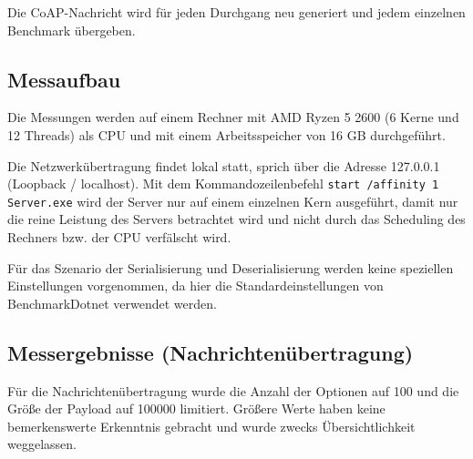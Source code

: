 Die CoAP-Nachricht wird für jeden Durchgang neu generiert und jedem einzelnen Benchmark übergeben.

\subsection{Messaufbau}
\label{subsec:messaufbau}

Die Messungen werden auf einem Rechner mit AMD Ryzen 5 2600 (6 Kerne und 12 Threads) als CPU und mit einem Arbeitsspeicher von 16 GB durchgeführt.

Die Netzwerkübertragung findet lokal statt, sprich über die Adresse 127.0.0.1 (Loopback / localhost). Mit dem Kommandozeilenbefehl \texttt{start /affinity 1 Server.exe} wird der Server nur auf einem einzelnen Kern ausgeführt, damit nur die reine Leistung des Servers betrachtet wird und nicht durch das Scheduling des Rechners bzw. der CPU verfälscht wird.

Für das Szenario der Serialisierung und Deserialisierung werden keine speziellen Einstellungen vorgenommen, da hier die Standardeinstellungen von BenchmarkDotnet verwendet werden.

\subsection{Messergebnisse (Nachrichtenübertragung)}
\label{subsec:messergebnisse-nachrichtenuebertragung}

Für die Nachrichtenübertragung wurde die Anzahl der Optionen auf 100 und die Größe der Payload auf 100000 limitiert. Größere Werte haben keine bemerkenswerte Erkenntnis gebracht und wurde zwecks Übersichtlichkeit weggelassen.

\begin{table}[h]
    \caption{Asynchrone Übertragung mit 100 Options und mit einer Payload von 100 Bytes.}
    \label{tab:asynchrone-uebertragung-100-100}
\end{table}

